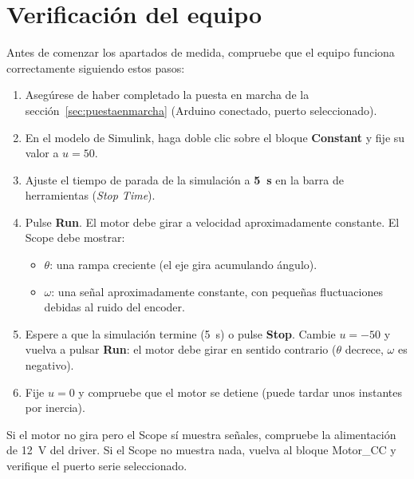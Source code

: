 \documentclass[12pt,a4paper]{article}
\begin{document}
\section{Verificación del equipo}

Antes de comenzar los apartados de medida, compruebe que el equipo funciona
correctamente siguiendo estos pasos:

\begin{enumerate}
  \item Asegúrese de haber completado la puesta en marcha de la
        sección~\ref{sec:puestaenmarcha} (Arduino conectado, puerto seleccionado).

  \item En el modelo de Simulink, haga doble clic sobre el bloque \textbf{Constant}
        y fije su valor a $u = 50$.

  \item Ajuste el tiempo de parada de la simulación a \textbf{5~s} en la barra de
        herramientas (\emph{Stop Time}).

  \item Pulse \textbf{Run}. El motor debe girar a velocidad aproximadamente constante.
        El Scope debe mostrar:
        \begin{itemize}[noitemsep]
          \item $\theta$: una rampa creciente (el eje gira acumulando ángulo).
          \item $\omega$: una señal aproximadamente constante, con pequeñas
                fluctuaciones debidas al ruido del encoder.
        \end{itemize}

  \item Espere a que la simulación termine (5~s) o pulse \textbf{Stop}.
        Cambie $u = -50$ y vuelva a pulsar \textbf{Run}: el motor debe girar
        en sentido contrario ($\theta$ decrece, $\omega$ es negativo).

  \item Fije $u = 0$ y compruebe que el motor se detiene (puede tardar unos
        instantes por inercia).
\end{enumerate}

\begin{notabox}
  Si el motor no gira pero el Scope sí muestra señales, compruebe la alimentación
  de 12~V del driver. Si el Scope no muestra nada, vuelva al bloque Motor\_CC
  y verifique el puerto serie seleccionado.
\end{notabox}
\end{document}
